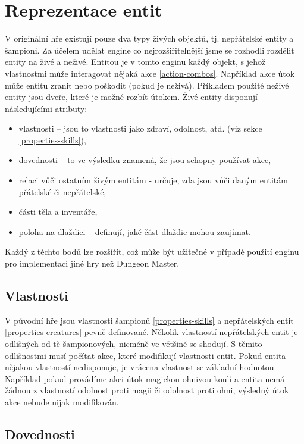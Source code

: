 \section{Reprezentace entit}

V originální hře existují pouze dva typy živých objektů, tj. nepřátelské entity a šampioni. Za účelem udělat engine
co nejrozšiřitelnější  jsme se rozhodli rozdělit entity na živé a neživé.   
Entitou je v tomto enginu každý objekt, s jehož vlastnostmi může interagovat nějaká akce \vref{action-combos}.
Například akce útok může entitu zranit nebo poškodit  (pokud je neživá). Příkladem použité neživé entity 
jsou dveře, které je možné rozbít útokem. Živé entity disponují následujícími atributy:

\begin{itemize}
\item vlastnosti -- jsou to vlastnosti jako zdraví, odolnost,  atd.  (viz sekce \ref{properties-skills}),
\item dovednosti -- to ve výsledku znamená, že jsou schopny používat akce,
\item relaci vůči ostatním živým entitám - určuje, zda jsou vůči daným entitám přátelské či nepřátelské,
\item části těla a inventáře,
\item poloha na dlaždici -- definují, jaké část dlaždic mohou zaujímat.
\end{itemize}

Každý z těchto bodů lze rozšířit, což může být užitečné v případě použití enginu pro implementaci jiné hry než Dungeon Master. 

\subsection{Vlastnosti}\label{entity-properties}

V původní hře jsou vlastnosti šampionů \vref{properties-skills} a nepřátelských entit \vref{properties-creatures} pevně definované. 
Několik vlastností nepřátelských entit je odlišných od tě šampionových, nicméně ve většině se shodují.
S těmito odlišnostmi musí počítat akce, které modifikují vlastnosti entit. Pokud entita nějakou vlastností nedisponuje, je vrácena 
vlastnost se základní hodnotou. Například pokud provádíme akci útok magickou ohnivou koulí a entita nemá žádnou z vlastností
odolnost proti magii či odolnost proti ohni, výsledný útok akce nebude nijak modifikován. 

 \subsection{Dovednosti}

